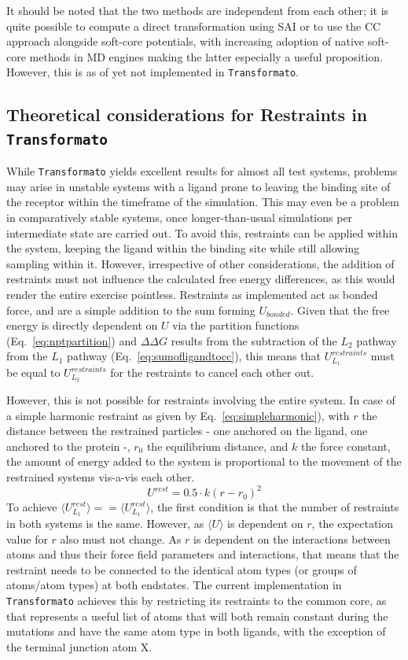 \documentclass[oneside]{scrreprt}
\begin{document}
It should be noted that the two methods are independent from each other; it is quite possible to compute a direct transformation using SAI or to use the CC approach alongside soft-core potentials, with increasing adoption of native soft-core methods in MD engines making the latter especially a useful proposition. However, this is as of yet not implemented in \texttt{Transformato}.
\subsection{Theoretical considerations for Restraints in \texttt{Transformato}} \label{sec:theocons}
While \texttt{Transformato} yields excellent results for almost all test systems, problems may arise in unstable systems with a ligand prone to leaving the binding site of the receptor within the timeframe of the simulation. This may even be a problem in comparatively stable systems, once longer-than-usual simulations per intermediate state are carried out. To avoid this, restraints can be applied within the system, keeping the ligand within the binding site while still allowing sampling within it. However, irrespective of other considerations, the addition of restraints must not influence the calculated free energy differences, as this would render the entire exercise pointless. Restraints as implemented act as bonded force, and are a simple addition to the sum forming $U_{bonded}$. Given that the free energy is directly dependent on $U$ via the partition functions (Eq.~\ref{eq:nptpartition}) and $\Delta \Delta G$ results from the subtraction of the $L_2$ pathway from the $L_1$ pathway (Eq.~\ref{eq:sumofligandtocc}), this means that $U^{restraints}_{L_1}$ must be equal to $U^{restraints}_{L_2}$ for the restraints to cancel each other out.

However, this is not possible for restraints involving the entire system. In case of a simple harmonic restraint as given by Eq.~\ref{eq:simpleharmonic}), with $r$ the distance between the restrained particles - one anchored on the ligand, one anchored to the protein -, $r_0$ the equilibrium distance, and $k$ the force constant,  the amount of energy added to the system is proportional to the movement of the restrained systems vis-a-vis each other.
\begin{equation}\label{eq:simpleharmonic}
    U^{rest}=0.5\cdot k(r-r_0)^2 
\end{equation}
To achieve $\langle U^{rest}_{L_1}\rangle == \langle U^{rest}_{L_1}\rangle$, the first condition is that the  number of restraints in both systems is the same. However, as $\langle U \rangle$ is dependent on $r$, the expectation value for $r$  also must not change. As $r$ is dependent on the interactions between atoms and thus their force field parameters and interactions, that means that the restraint needs to be connected to the identical atom types (or groups of atoms/atom types) at both endstates. The current implementation in \texttt{Transformato} achieves this by restricting its restraints to the common core, as that represents a useful list of atoms that will both remain constant during the mutations and have the same atom type in both ligands, with the exception of the terminal junction atom X.
\end{document}
